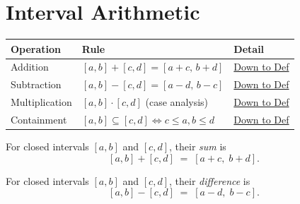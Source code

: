 
\section{Interval Arithmetic}

\begin{tcolorbox}[colback=gray!6, colframe=gray!40, arc=2pt,
  left=6pt, right=6pt, top=4pt, bottom=4pt,
  title={\small\textbf{Interval Arithmetic - Quick Reference}},
  fonttitle=\small\bfseries]
\small
\begin{tabular}{l l l}
\toprule
\textbf{Operation} & \textbf{Rule} & \textbf{Detail} \\
\midrule
Addition       & $[a,b] + [c,d] = [a+c,\, b+d]$           & \hyperref[def:interval-add]{Down to Def} \\
Subtraction    & $[a,b] - [c,d] = [a-d,\, b-c]$           & \hyperref[def:interval-sub]{Down to Def} \\
Multiplication & $[a,b] \cdot [c,d]$ (case analysis)      & \hyperref[def:interval-mult]{Down to Def} \\
Containment    & $[a,b] \subseteq [c,d] \iff c\leq a, b\leq d$ & \hyperref[def:interval-contain]{Down to Def} \\
\bottomrule
\end{tabular}
\end{tcolorbox}

\vspace{1em}

\begin{tcolorbox}[colback=propbox, colframe=propborder, arc=2pt,
  left=6pt, right=6pt, top=4pt, bottom=4pt,
  title={\small\textbf{Definition (Interval Addition)}},
  fonttitle=\small\bfseries]
\label{def:interval-add}
For closed intervals $[a,b]$ and $[c,d]$, their \emph{sum} is
\[
  [a,b] + [c,d] \;=\; [a+c,\; b+d].
\]
\end{tcolorbox}

\begin{tcolorbox}[colback=propbox, colframe=propborder, arc=2pt,
  left=6pt, right=6pt, top=4pt, bottom=4pt,
  title={\small\textbf{Definition (Interval Subtraction)}},
  fonttitle=\small\bfseries]
\label{def:interval-sub}
For closed intervals $[a,b]$ and $[c,d]$, their \emph{difference} is
\[
  [a,b] - [c,d] \;=\; [a-d,\; b-c].
\]
\end{tcolorbox}

